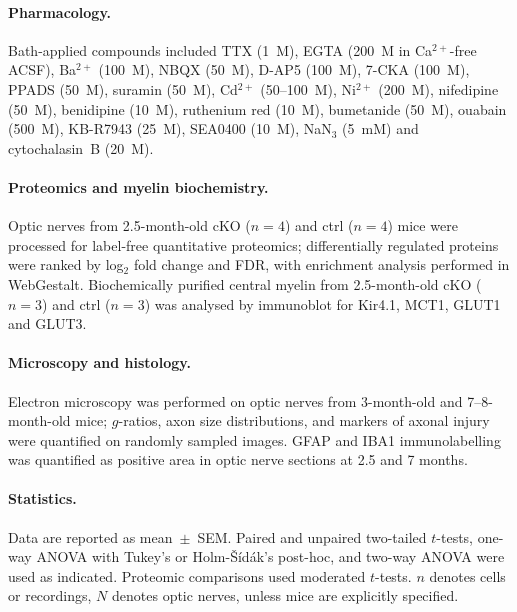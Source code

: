 \documentclass[11pt,a4paper]{article}
\begin{document}
\paragraph{Pharmacology.} Bath-applied compounds included TTX (1~\textmu M), EGTA (200~\textmu M in Ca$^{2+}$-free ACSF), Ba$^{2+}$ (100~\textmu M), NBQX (50~\textmu M), D-AP5 (100~\textmu M), 7-CKA (100~\textmu M), PPADS (50~\textmu M), suramin (50~\textmu M), Cd$^{2+}$ (50--100~\textmu M), Ni$^{2+}$ (200~\textmu M), nifedipine (50~\textmu M), benidipine (10~\textmu M), ruthenium red (10~\textmu M), bumetanide (50~\textmu M), ouabain (500~\textmu M), KB-R7943 (25~\textmu M), SEA0400 (10~\textmu M), NaN$_3$ (5~mM) and cytochalasin~B (20~\textmu M).

\paragraph{Proteomics and myelin biochemistry.} Optic nerves from 2.5-month-old cKO ($n=4$) and ctrl ($n=4$) mice were processed for label-free quantitative proteomics; differentially regulated proteins were ranked by log$_2$ fold change and FDR, with enrichment analysis performed in WebGestalt. Biochemically purified central myelin from 2.5-month-old cKO ($n=3$) and ctrl ($n=3$) was analysed by immunoblot for Kir4.1, MCT1, GLUT1 and GLUT3.

\paragraph{Microscopy and histology.} Electron microscopy was performed on optic nerves from 3-month-old and 7--8-month-old mice; $g$-ratios, axon size distributions, and markers of axonal injury were quantified on randomly sampled images. GFAP and IBA1 immunolabelling was quantified as positive area in optic nerve sections at 2.5 and 7 months.

\paragraph{Statistics.} Data are reported as mean~$\pm$~SEM. Paired and unpaired two-tailed $t$-tests, one-way ANOVA with Tukey's or Holm-\v{S}{\'i}d{\'a}k's post-hoc, and two-way ANOVA were used as indicated. Proteomic comparisons used moderated $t$-tests. $n$ denotes cells or recordings, $N$ denotes optic nerves, unless mice are explicitly specified.



\end{document}
